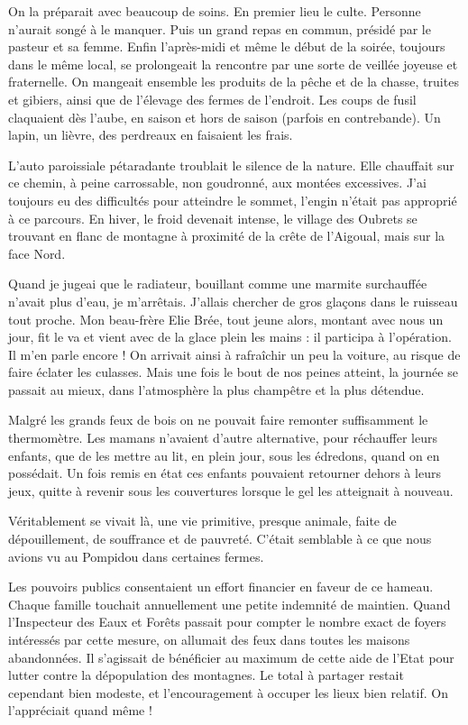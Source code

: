 On la préparait avec beaucoup de soins. En premier lieu le culte. Personne n’aurait
songé à le manquer. Puis un grand repas en commun, présidé par le pasteur et sa
femme. Enfin l’après-midi et même le début de la soirée, toujours dans le même
local, se prolongeait la rencontre par une sorte de veillée joyeuse et fraternelle. On
mangeait ensemble les produits de la pêche et de la chasse, truites et gibiers, ainsi que
de l’élevage des fermes de l’endroit. Les coups de fusil claquaient dès l’aube, en
saison et hors de saison (parfois en contrebande). Un lapin, un lièvre, des perdreaux
en faisaient les frais.

L’auto paroissiale pétaradante troublait le silence de la nature. Elle chauffait sur ce
chemin, à peine carrossable, non goudronné, aux montées excessives. J’ai toujours eu
des difficultés pour atteindre le sommet, l’engin n’était pas approprié à ce parcours.
En hiver, le froid devenait intense, le village des Oubrets se trouvant en flanc de
montagne à proximité de la crête de l’Aigoual, mais sur la face Nord.

Quand je jugeai que le radiateur, bouillant comme une marmite surchauffée n’avait
plus d’eau, je m’arrêtais. J’allais chercher de gros glaçons dans le ruisseau tout
proche. Mon beau-frère Elie Brée, tout jeune alors, montant avec nous un jour, fit le
va et vient avec de la glace plein les mains : il participa à l’opération. Il m’en parle
encore ! On arrivait ainsi à rafraîchir un peu la voiture, au risque de faire éclater les
culasses. Mais une fois le bout de nos peines atteint, la journée se passait au mieux,
dans l’atmosphère la plus champêtre et la plus détendue.


Malgré les grands feux de bois on ne pouvait faire remonter suffisamment le
thermomètre. Les mamans n’avaient d’autre alternative, pour réchauffer leurs enfants,
que de les mettre au lit, en plein jour, sous les édredons, quand on en possédait. Un
fois remis en état ces enfants pouvaient retourner dehors à leurs jeux, quitte à revenir
sous les couvertures lorsque le gel les atteignait à nouveau.

Véritablement se vivait là, une vie primitive, presque animale, faite de dépouillement,
de souffrance et de pauvreté. C’était semblable à ce que nous avions vu au Pompidou
dans certaines fermes.

Les pouvoirs publics consentaient un effort financier en faveur de ce hameau. Chaque
famille touchait annuellement une petite indemnité de maintien. Quand l’Inspecteur
des Eaux et Forêts passait pour compter le nombre exact de foyers intéressés par cette
mesure, on allumait des feux dans toutes les maisons abandonnées. Il s’agissait de
bénéficier au maximum de cette aide de l’Etat pour lutter contre la dépopulation des
montagnes. Le total à partager restait cependant bien modeste, et l’encouragement à
occuper les lieux bien relatif. On l’appréciait quand même !

